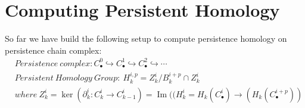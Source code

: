 \documentclass[11pt,a4paper]{report}
\DeclareMathOperator{\Ima}{Im}
\begin{document}



              
              
              
            \chapter{Computing Persistent Homology}

            So far we have build the following setup to compute persistence homology on persistence chain complex:
              \begin{align*}
                &Persistence \ complex: C_\bullet^0 \hookrightarrow C_\bullet^1 \hookrightarrow C_\bullet^2 \hookrightarrow \cdots\\
                &Persistent \ Homology \ Group: \ H_k^{i,p} = Z_k^i / B_k^{i+p} \cap Z_k^i\\
                & where \ Z_k^i = \ker (\partial_k^i : C_k^i \rightarrow C_{k-1}^i)
                =\Ima ((H_k^i = H_k ( C_\bullet^i) \rightarrow (H_k ( C_\bullet^{i+p}))\\
              \end{align*}
\end{document}
